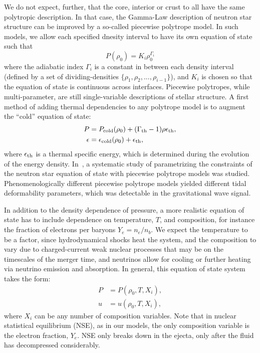 We do not expect, further, that the core, interior or crust to all have the same polytropic description.
In that case, the Gamma-Law description of neutron star structure can be improved by a so-called piecewise polytrope model.
In such models, we allow each specified dnesity interval to have its own equation of state such that 
$$P(\rho_0) = K_i \rho_0^{\Gamma_i}$$
where the adiabatic index $\Gamma_i$ is a constant in between each density interval (defined by a set of dividing-densities $\{\rho_1,\rho_2,...,\rho_{i-1} \}$), and $K_i$ is chosen so that the equation of state is continuous across interfaces.
Piecewise polytropes, while multi-parameter, are still single-variable descriptions of stellar structure.  
A first method of adding thermal dependencies to any polytrope model is to augment the ``cold'' equation of state:
\begin{align}
P &=  P_{\rm cold}(\rho_0) + (\Gamma_{\rm th}-1)\rho\epsilon_{\rm th} ,\\
\epsilon &=  \epsilon_{\rm cold}(\rho_0) + \epsilon_{\rm th}, 
\end{align}
where $\epsilon_{\rm th}$ is a thermal specific energy, which is determined during the evolution of the energy density.
In~\cite{read2009constraints}, a systematic study of parametrizing the constraints of the neutron star equation of state  with piecewise polytrope models was studied.  
Phenomenologically different piecewise polytrope models yielded different tidal deformability parameters, which was detectable in the gravitational wave signal.


In addition to the density dependence of pressure, a more realistic equation of state has to include dependence on temperature, $T$, and composition, for instance the fraction of electrons per baryons $Y_e = n_e / n_b$.  
We expect the temperature to be a factor, since hydrodynamical shocks heat the system, and the composition to vary due to charged-current weak nuclear processes that may be on the timescales of the merger time, and neutrinos allow for cooling or further heating via neutrino emission and absorption. 
In general, this equation of state system takes the form:
\begin{align}
P &= P(\rho_0, T, X_i), \\
u &= u(\rho_0, T, X_i),
\end{align}
where $X_i$ can be any number of composition variables.  
Note that in nuclear statistical equilibrium (NSE), as in our models, the only composition variable is the electron fraction, $Y_e$.  
NSE only breaks down in the ejecta, only after the fluid has decompressed considerably.

